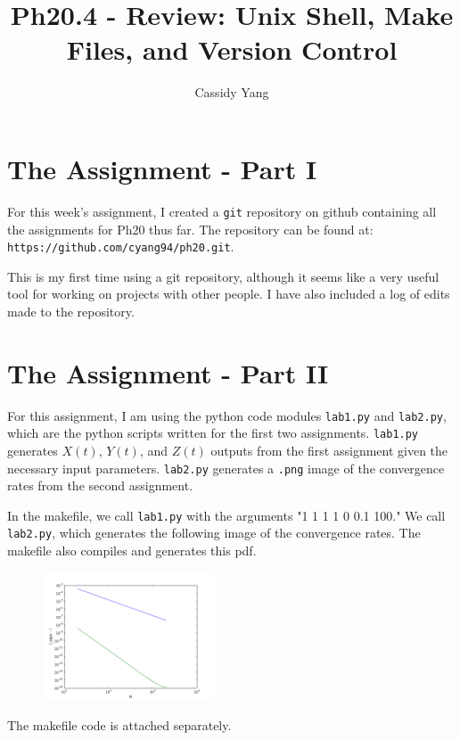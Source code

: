 \documentclass{article}
\begin{document}
\title{Ph20.4 - Review: Unix Shell, Make Files, and Version Control}
\author{Cassidy Yang}
\maketitle
\pagestyle{fancy}

\section{The Assignment - Part I}

For this week's assignment, I created a \texttt{git} repository on github containing all the assignments for Ph20 thus far. The repository can be found at: \texttt{https://github.com/cyang94/ph20.git}.

This is my first time using a git repository, although it seems like a very useful tool for working on projects with other people. I have also included a log of edits made to the repository.

\section{The Assignment - Part II}

For this assignment, I am using the python code modules \texttt{lab1.py} and \texttt{lab2.py}, which are the python scripts written for the first two assignments. \texttt{lab1.py} generates $X(t)$, $Y(t)$, and $Z(t)$ outputs from the first assignment given the necessary input parameters. \texttt{lab2.py} generates a \texttt{.png} image of the convergence rates from the second assignment.

In the makefile, we call \texttt{lab1.py} with the arguments "1 1 1 1 0 0.1 100." We call \texttt{lab2.py}, which generates the following image of the convergence rates. The makefile also compiles and generates this pdf.

\begin{figure}[ht!]
	\centering
	\includegraphics[width=2in]{conv.png}
\end{figure}

The makefile code is attached separately.
\end{document}
